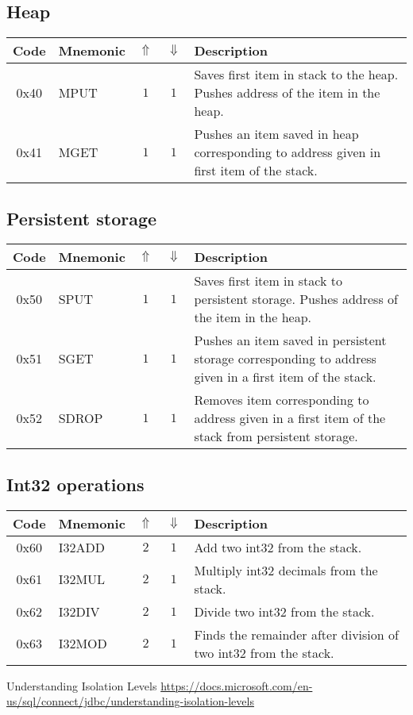 \documentclass[12pt,a4paper]{article}
\begin{document}
\subsection{Heap}
\begin{tabularx}{\textwidth}{ c l c c p{7cm} }
\textbf{Code} & \textbf{Mnemonic} & \textbf{$\Uparrow$} & \textbf{$\Downarrow$} & \textbf{Description} \\
\hline
0x40 & MPUT & $1$ & $1$ & Saves first item in stack to the heap. Pushes address of the item in the heap. \\
\hline
0x41 & MGET & $1$ & $1$ & Pushes an item saved in heap corresponding to address given in first item of the stack.  \\
\hline
\end{tabularx}

\subsection{Persistent storage}
\begin{tabularx}{\textwidth}{ c l c c p{7cm} }
\textbf{Code} & \textbf{Mnemonic} & \textbf{$\Uparrow$} & \textbf{$\Downarrow$} & \textbf{Description} \\
\hline
0x50 & SPUT & $1$ & $1$ & Saves first item in stack to persistent storage. Pushes address of the item in the heap. \\
\hline
0x51 & SGET & $1$ & $1$ & Pushes an item saved in persistent storage corresponding to address given in a first item of the stack.  \\
0x52 & SDROP & $1$ & $1$ & Removes item corresponding to address given in a first item of the stack from persistent storage.  \\
\hline
\end{tabularx}

\subsection{Int32 operations}
\begin{tabularx}{\textwidth}{ c l c c p{7cm} }
\textbf{Code} & \textbf{Mnemonic} & \textbf{$\Uparrow$} & \textbf{$\Downarrow$} & \textbf{Description} \\
\hline
0x60 & I32ADD & $2$ & $1$ & Add two int32 from the stack. \\
\hline
0x61 & I32MUL & $2$ & $1$ & Multiply int32 decimals from the stack. \\
\hline
0x62 & I32DIV & $2$ & $1$ & Divide two int32 from the stack. \\
\hline
0x63 & I32MOD & $2$ & $1$ & Finds the remainder after division of two int32 from the stack. \\
\hline
\end{tabularx}

\begin{thebibliography}{9}

 Understanding Isolation Levels \url{https://docs.microsoft.com/en-us/sql/connect/jdbc/understanding-isolation-levels}
\end{thebibliography}
\end{document}
